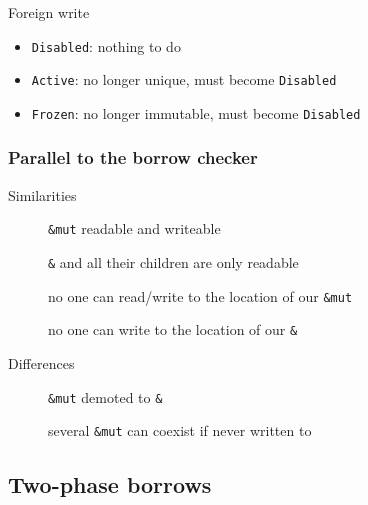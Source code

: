 \begin{frame}[t]
\begin{onlyenv}
        \begin{block}{Foreign write}
            \begin{itemize}
                \item \texttt{Disabled}: nothing to do
                \item \texttt{Active}: no longer unique, must become \texttt{Disabled}
                \item \texttt{Frozen}: no longer immutable, must become \texttt{Disabled}
            \end{itemize}
        \end{block}
    \end{onlyenv}
\end{frame}

\begin{frame}
    \frametitle{Parallel to the borrow checker}
    Similarities
    \hspace{-5em}
    \begin{description}
        \item[\cmark] \texttt{\&mut} readable and writeable
        \item[\cmark] \texttt{\&} and all their children are only readable
        \item[\cmark] no one can read/write to the location of our \texttt{\&mut}
        \item[\cmark] no one can write to the location of our \texttt{\&}
    \end{description}

    Differences
    \hspace{-5em}
    \begin{description}
        \item[\xmark] \texttt{\&mut} demoted to \texttt{\&}
        \item[\xmark] several \texttt{\&mut} can coexist if never written to
    \end{description}
\end{frame}

\subsection{Two-phase borrows}

